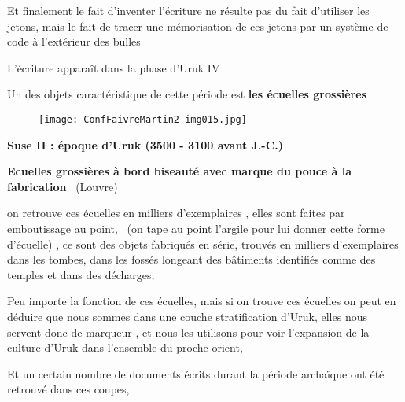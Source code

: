 \documentclass[a4paper]{article}
\begin{document}
{
Et finalement le fait d'inventer l'écriture ne résulte pas du fait d'utiliser les jetons, mais le fait de tracer une
mémorisation de ces jetons par un système de code à l'extérieur des bulles}


\bigskip

{
L'écriture apparaît dans la phase d'Uruk IV}


\bigskip

{
Un des objets caractéristique de cette période est \textbf{les écuelles grossières}}


\bigskip


\bigskip


\bigskip

\newline


\begin{figure}
\centering
\texttt{[image: ConfFaivreMartin2-img015.jpg]}
\end{figure}

\bigskip

{
\textbf{\textcolor[rgb]{0.18039216,0.18039216,0.18039216}{Suse II : époque d'Uruk (3500 - 3100 avant J.-C.)}} }

{
\textbf{\textcolor[rgb]{0.18039216,0.18039216,0.18039216}{Ecuelles grossières à bord biseauté avec marque du pouce à la
fabrication}} \ (Louvre)}


\bigskip


\bigskip

{
on retrouve ces écuelles en milliers d'exemplaires , elles sont faites par emboutissage au point, \ (on tape au point
l'argile pour lui donner cette forme d'écuelle) , ce sont des objets fabriqués en série, trouvés en milliers
d'exemplaires dans les tombes, dans les fossés longeant des bâtiments identifiés comme des temples et dans des
décharges;}

{
Peu importe la fonction de ces écuelles, mais si on trouve ces écuelles on peut en déduire que nous sommes dans une
couche stratification d'Uruk, elles nous servent donc de marqueur , et nous les utilisons pour voir l'expansion de la
culture d'Uruk dans l'ensemble du proche orient, }


\bigskip

{
Et un certain nombre de documents écrits durant la période archaïque ont été retrouvé dans ces coupes, }
\end{document}
